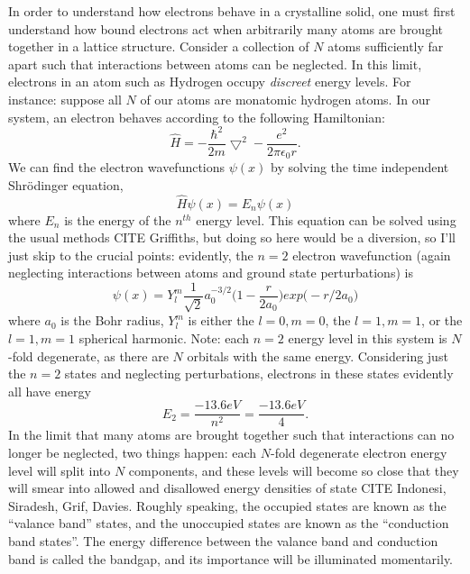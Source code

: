 \indent In order to understand how electrons behave in a crystalline solid, one must first understand how bound electrons act when arbitrarily many atoms are brought together in a lattice structure. Consider a collection of $N$ atoms sufficiently far apart such that interactions between atoms can be neglected. In this limit, electrons in an atom such as Hydrogen occupy \textit{discreet} energy levels. For instance: suppose all $N$ of our atoms are monatomic hydrogen atoms. In our system, an electron behaves according to the following Hamiltonian:
\begin{equation}
\hat{H} = -\frac{\hbar^2}{2m} \bigtriangledown^2 - \frac{e^2}{2\pi \epsilon_0 r}.
\end{equation}
We can find the electron wavefunctions $\psi(x)$ by solving the time independent Shr\"{o}dinger equation,
\begin{equation}
\hat{H}\psi(x) = E_n\psi(x)
\end{equation}
where $E_n$ is the energy of the $n^{th}$ energy level. This equation can be solved using the usual methods CITE Griffiths, but doing so here would be a diversion, so I'll just skip to the crucial points: evidently, the $n=2$ electron wavefunction (again neglecting interactions between atoms and ground state perturbations) is
\begin{equation}
\psi(x) = Y^m_l\frac{1}{\sqrt{2}}a^{-3/2}_0\Big(1-\frac{r}{2a_0}\Big ) exp\big(-r/2a_0 \big)
\end{equation}
where $a_0$ is the Bohr radius, $Y^m_l$ is either the $l=0, m=0$, the $l=1, m=1$, or the $l=1, m=1$ spherical harmonic. Note: each $n = 2$ energy level in this system is $N$-fold degenerate, as there are $N$ orbitals with the same energy. Considering just the $n = 2$ states and neglecting perturbations, electrons in these states evidently all have energy
\begin{equation}
E_2 = \frac{-13.6eV}{n^2} = \frac{-13.6eV}{4}.
\end{equation}
In the limit that many atoms are brought together such that interactions can no longer be neglected, two things happen: each $N$-fold degenerate electron energy level will split into $N$ components, and these levels will become so close that they will smear into allowed and disallowed energy densities of state CITE Indonesi, Siradesh, Grif, Davies. Roughly speaking, the occupied states are known as the ``valance band'' states, and the unoccupied states are known as the ``conduction band states''. The energy difference between the valance band and conduction band is called the bandgap, and its importance will be illuminated momentarily. 

